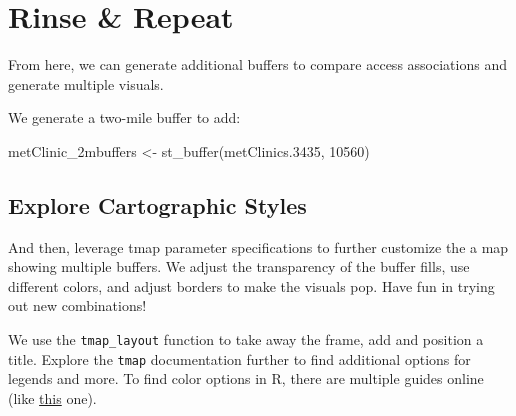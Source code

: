 \documentclass[
  letterpaper,
  DIV=11,
  numbers=noendperiod]{scrreprt}
\newenvironment{Shaded}{\begin{snugshade}}{\end{snugshade}}
\newcommand{\DecValTok}[1]{\textcolor[rgb]{0.68,0.00,0.00}{#1}}
\newcommand{\FloatTok}[1]{\textcolor[rgb]{0.68,0.00,0.00}{#1}}
\newcommand{\FunctionTok}[1]{\textcolor[rgb]{0.28,0.35,0.67}{#1}}
\newcommand{\NormalTok}[1]{\textcolor[rgb]{0.00,0.23,0.31}{#1}}
\newcommand{\OtherTok}[1]{\textcolor[rgb]{0.00,0.23,0.31}{#1}}
\begin{document}
\section{Rinse \& Repeat}\label{rinse-repeat}

From here, we can generate additional buffers to compare access
associations and generate multiple visuals.

We generate a two-mile buffer to add:

\begin{Shaded}
\begin{Highlighting}[]
\NormalTok{metClinic\_2mbuffers }\OtherTok{\textless{}{-}} \FunctionTok{st\_buffer}\NormalTok{(metClinics}\FloatTok{.3435}\NormalTok{, }\DecValTok{10560}\NormalTok{)}
\end{Highlighting}
\end{Shaded}

\subsection{Explore Cartographic
Styles}\label{explore-cartographic-styles}

And then, leverage tmap parameter specifications to further customize
the a map showing multiple buffers. We adjust the transparency of the
buffer fills, use different colors, and adjust borders to make the
visuals pop. Have fun in trying out new combinations!

We use the \texttt{tmap\_layout} function to take away the frame, add
and position a title. Explore the \texttt{tmap} documentation further to
find additional options for legends and more. To find color options in
R, there are multiple guides online (like
\href{https://bookdown.org/hneth/ds4psy/D-2-apx-colors-essentials.html}{this}
one).
\end{document}
